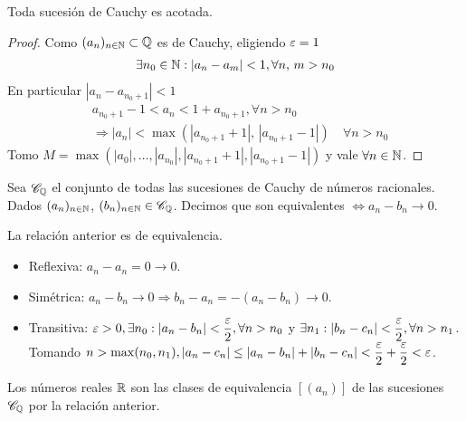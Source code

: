 \begin{theorem}
  Toda sucesión de Cauchy es acotada.
  \begin{proof}
    Como \((a_n)_{n \in \mathbb{N}} \subset \mathbb{Q} \) es de Cauchy, eligiendo \(\varepsilon = 1\) \begin{align*}
      \exists n_0 \in \mathbb{N} : |a_n - a_m| < 1, \forall n\text{, }m > n_0
    \end{align*}
    En particular \(|a_n - a_{n_0+1}| < 1\)
    \begin{align*}
       & a_{n_0+1} - 1 < a_n < 1 + a_{n_0+1}, \forall n > n_0                                     \\
       & \Rightarrow |a_n| < \max(|a_{n_0+1} + 1|\text{, } |a_{n_0+1} - 1|) \quad \forall n > n_0
    \end{align*}
    Tomo \(M = \max(|a_0|, \ldots, |a_{n_0}|, |a_{n_0+1} + 1|, |a_{n_0+1} - 1|)\) y vale \(\forall n \in \mathbb{N} \).
  \end{proof}
\end{theorem}

\begin{definition}
  Sea \(\mathscr{C}_{\mathbb{Q}} \) el conjunto de todas las sucesiones de Cauchy de números racionales. Dados \((a_n)_{n \in \mathbb{N}} \), \((b_n)_{n \in \mathbb{N}} \in \mathscr{C}_{\mathbb{Q}} \). Decimos que son equivalentes \(\iff a_n - b_n \to 0\).
\end{definition}

\clearpage

\begin{prop}
  La relación anterior es de equivalencia. \begin{itemize}
    \item Reflexiva: \(a_n - a_n = 0 \to 0\).
    \item Simétrica: \(a_n - b_n \to 0 \Rightarrow b_n - a_n = -(a_n-b_n) \to 0\).
    \item Transitiva: \(\varepsilon > 0, \exists n_0 : |a_n - b_n| < \dfrac{\varepsilon}{2}, \forall n > n_0\)
          y \(\exists n_1 : |b_n - c_n| < \dfrac{\varepsilon}{2}, \forall n > n_1\). Tomando \(n > \max(n_0, n_1), |a_n - c_n| \leq |a_n - b_n| + |b_n - c_n| < \dfrac{\varepsilon}{2} + \dfrac{\varepsilon}{2} < \varepsilon \).
  \end{itemize}
\end{prop}

\begin{definition}
  Los números reales \(\mathbb{R} \) son las clases de equivalencia \([(a_n)]\) de las sucesiones \(\mathscr{C}_{\mathbb{Q}} \) por la relación anterior.
\end{definition}

